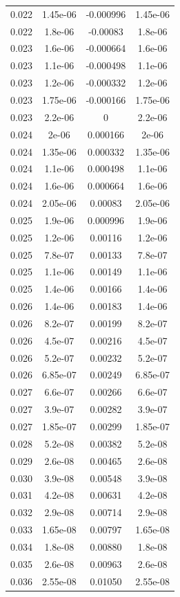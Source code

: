 \documentclass[11pt,ngerman,a4paper]{article}
\begin{document}
\begin{longtable}{SSSS}
0.022 & 1.45e-06 & -0.000996 & 1.45e-06\\
0.022 & 1.8e-06 & -0.00083 & 1.8e-06\\
0.023 & 1.6e-06 & -0.000664 & 1.6e-06\\
0.023 & 1.1e-06 & -0.000498 & 1.1e-06\\
0.023 & 1.2e-06 & -0.000332 & 1.2e-06\\
0.023 & 1.75e-06 & -0.000166 & 1.75e-06\\
0.023 & 2.2e-06 & 0 & 2.2e-06\\
0.024 & 2e-06 & 0.000166 & 2e-06\\
0.024 & 1.35e-06 & 0.000332 & 1.35e-06\\
0.024 & 1.1e-06 & 0.000498 & 1.1e-06\\
0.024 & 1.6e-06 & 0.000664 & 1.6e-06\\
0.024 & 2.05e-06 & 0.00083 & 2.05e-06\\
0.025 & 1.9e-06 & 0.000996 & 1.9e-06\\
0.025 & 1.2e-06 & 0.00116 & 1.2e-06\\
0.025 & 7.8e-07 & 0.00133 & 7.8e-07\\
0.025 & 1.1e-06 & 0.00149 & 1.1e-06\\
0.025 & 1.4e-06 & 0.00166 & 1.4e-06\\
0.026 & 1.4e-06 & 0.00183 & 1.4e-06\\
0.026 & 8.2e-07 & 0.00199 & 8.2e-07\\
0.026 & 4.5e-07 & 0.00216 & 4.5e-07\\
0.026 & 5.2e-07 & 0.00232 & 5.2e-07\\
0.026 & 6.85e-07 & 0.00249 & 6.85e-07\\
0.027 & 6.6e-07 & 0.00266 & 6.6e-07\\
0.027 & 3.9e-07 & 0.00282 & 3.9e-07\\
0.027 & 1.85e-07 & 0.00299 & 1.85e-07\\
0.028 & 5.2e-08 & 0.00382 & 5.2e-08\\
0.029 & 2.6e-08 & 0.00465 & 2.6e-08\\
0.030 & 3.9e-08 & 0.00548 & 3.9e-08\\
0.031 & 4.2e-08 & 0.00631 & 4.2e-08\\
0.032 & 2.9e-08 & 0.00714 & 2.9e-08\\
0.033 & 1.65e-08 & 0.00797 & 1.65e-08\\
0.034 & 1.8e-08 & 0.00880 & 1.8e-08\\
0.035 & 2.6e-08 & 0.00963 & 2.6e-08\\
0.036 & 2.55e-08 & 0.01050 & 2.55e-08\\

\end{longtable}
\end{document}
